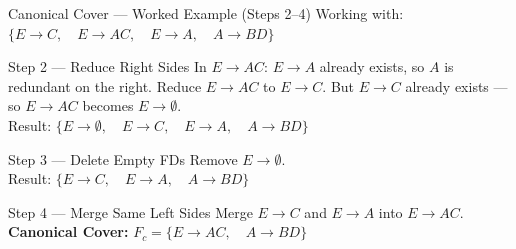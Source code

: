 \begin{frame}{Canonical Cover --- Worked Example (Steps 2--4)}
  Working with: $\{E \to C, \quad E \to AC, \quad E \to A, \quad A \to BD\}$

  \vspace{6pt}
  \begin{block}{Step 2 --- Reduce Right Sides}
    In $E \to AC$: $E \to A$ already exists, so $A$ is redundant on the right.
    Reduce $E \to AC$ to $E \to C$.
    But $E \to C$ already exists --- so $E \to AC$ becomes $E \to \emptyset$.\\[4pt]
    Result: \quad $\{E \to \emptyset, \quad E \to C, \quad E \to A, \quad A \to BD\}$
  \end{block}

  \vspace{4pt}
  \begin{block}{Step 3 --- Delete Empty FDs}
    Remove $E \to \emptyset$.\\[4pt]
    Result: \quad $\{E \to C, \quad E \to A, \quad A \to BD\}$
  \end{block}

  \vspace{4pt}
  \begin{block}{Step 4 --- Merge Same Left Sides}
    Merge $E \to C$ and $E \to A$ into $E \to AC$.\\[4pt]
    \textbf{Canonical Cover:} \quad $F_c = \{E \to AC, \quad A \to BD\}$
  \end{block}
\end{frame}


